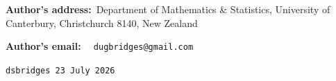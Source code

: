 \documentclass[11pt]{article}%
\begin{document}
%

\bigskip
%

\bigskip
%

\bigskip
%

\noindent
\textbf{{\small Author's address:}}{\small \ Department of Mathematics \&
Statistics, University of Canterbury, Christchurch 8140, New Zealand}%

\noindent
\textbf{{\small Author's email:} \ \thinspace}%
\texttt{{\small dugbridges@gmail.com}}

\bigskip

\vfill


\begin{flushright}
{\small \texttt{dsbridges 23 July 2026}}
\end{flushright}
\end{document}

